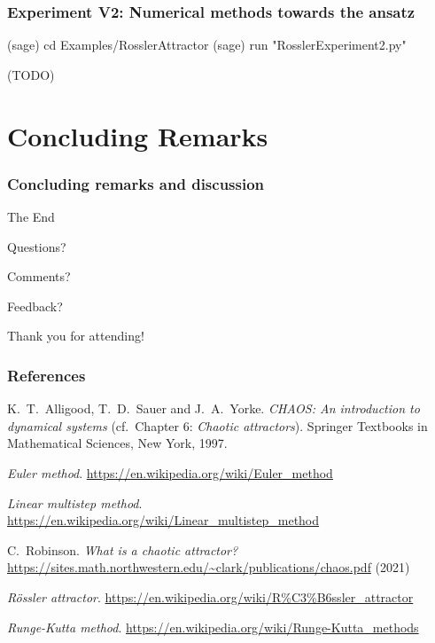 \documentclass[usenames,svgnames,dvipsnames,10pt]{beamer}
\begin{document}
\begin{frame}[fragile]
\frametitle{Experiment V2: Numerical methods towards the ansatz}

\begin{center}
\begin{code}
(sage) cd Examples/RosslerAttractor
(sage) run "RosslerExperiment2.py"
\end{code}
     (TODO)
\end{center}

\end{frame}

\section{Concluding Remarks} 

\begin{frame}
\frametitle{Concluding remarks and discussion} 

     \Huge{\centerline{The End}}\smallskip
     \Large{\centerline{Questions?}}\smallskip
     \Large{\centerline{Comments?}}\smallskip
     \Large{\centerline{Feedback?}}\bigskip
     \Huge{\centerline{Thank you for attending!}} 

\end{frame}

\begin{frame}[t,allowframebreaks] 
\frametitle{References} 

\footnotesize 
\begin{thebibliography}{10}

K.~T.~Alligood, T.~D.~Sauer and J.~A.~Yorke. 
\emph{CHAOS: An introduction to dynamical systems} 
(cf.\ Chapter 6: \emph{Chaotic attractors}). 
Springer Textbooks in Mathematical Sciences, New York, 1997. 

\emph{Euler method}. \url{https://en.wikipedia.org/wiki/Euler_method}

\emph{Linear multistep method}. \url{https://en.wikipedia.org/wiki/Linear_multistep_method} 

C.~Robinson. \emph{What is a chaotic attractor?} 
\url{https://sites.math.northwestern.edu/~clark/publications/chaos.pdf} (2021)

\emph{R\"ossler attractor}. \url{https://en.wikipedia.org/wiki/R\%C3\%B6ssler_attractor}

\emph{Runge-Kutta method}. \url{https://en.wikipedia.org/wiki/Runge-Kutta_methods} 

\end{thebibliography}

\end{frame} 

\end{document}
